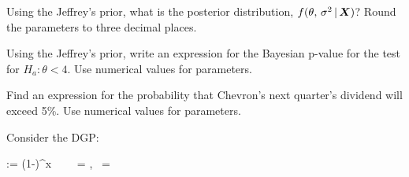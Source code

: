\documentclass[12pt]{article}
\begin{document}
\begin{enumerate}[(a)]

 Using the Jeffrey's prior, what is the posterior distribution, $f(\theta,\,\sigma^2\,|\,\boldsymbol{X})$? Round the parameters to three decimal places.


 Using the Jeffrey's prior, write an expression for the Bayesian p-value for the test for $H_a: \theta < 4$. Use numerical values for parameters.


 Find an expression for the probability that Chevron's next quarter's dividend will exceed 5\%. Use numerical values for parameters.



\end{enumerate}
\pagebreak

\problem Consider the DGP:

\beqn
\Xoneton \iid \geometric{\theta} := \theta(1-\theta)^x~~~~  = ,~ = 
\eeqn
\end{document}
